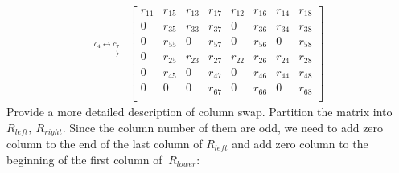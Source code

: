 \documentclass[12pt]{article}
\numberwithin{equation}{section}
\begin{document}
\begin{align*}
\xrightarrow{c_{4} \leftrightarrow c_{7}}
&\begin{bmatrix}
 r_{11} & r_{15} & r_{13} & r_{17} & r_{12} & r_{16} & r_{14} & r_{18}\\
 0      & r_{35} & r_{33} & r_{37} & 0      & r_{36} & r_{34} & r_{38}\\
 0      & r_{55} & 0      & r_{57} & 0      & r_{56} & 0      & r_{58}\\
 0      & r_{25} & r_{23} & r_{27} & r_{22} & r_{26} & r_{24} & r_{28}\\
 0      & r_{45} & 0      & r_{47} & 0      & r_{46} & r_{44} & r_{48}\\
 0      & 0      & 0      & r_{67} & 0      & r_{66} & 0      & r_{68}\\
\end{bmatrix}\end{align*}
{\color{blue}Provide a more detailed description of column swap.} Partition the matrix into \ $R_{left}, \ R_{right}$. Since the column number of them are odd, 
 we need to add zero column to  the end of the last column of  $R_{left}$ and add zero column to the beginning of the first column of  $\ R_{lower}$:
\end{document}
